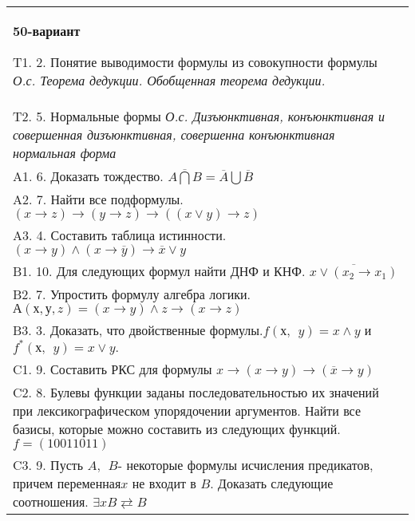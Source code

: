 \documentclass{article}
\begin{document}
\begin{tabular}{m{17cm}}
\textbf{50-вариант}
\newline

T1. 2. Понятие выводимости формулы из совокупности формулы \emph{О.с. Теорема дедукции. Обобщенная теорема дедукции.} \\
T2. 5. Нормальные формы \emph{О.с. Дизъюнктивная, конъюнктивная и совершенная дизъюнктивная, совершенна конъюнктивная нормальная форма} \\
A1. 6. Доказать тождество. \(\overline{A\bigcap B} = \overline{A}\bigcup\overline{B}\) \\
A2. 7. Найти все подформулы. \((x \rightarrow z) \rightarrow (y \rightarrow z) \rightarrow ((x \vee y) \rightarrow z)\) \\
A3. 4. Составить таблица истинности. \((x \rightarrow y) \land (x \rightarrow \overline{y}) \rightarrow \overline{x} \vee y\) \\
B1. 10. Для следующих формул найти ДНФ и КНФ. \(\overline{x \vee (x_{2} \rightarrow x_{1})}\) \\
B2. 7. Упростить формулу алгебра логики. \(А(х,у,z) = (x \rightarrow y) \land z \rightarrow (x \rightarrow z)\) \\
B3. 3. Доказать, что двойственные формулы.\(f(х,\ \ y) = x \land y\) и \(f^{*}(х,\ \ y) = x \vee y.\) \\
C1. 9. Составить РКС для формулы \(x \rightarrow (x \rightarrow y) \rightarrow (\overline{x} \rightarrow y)\ \) \\
C2. 8. Булевы функции заданы последовательностью их значений при лексикографическом упорядочении аргументов. Найти все базисы, которые можно составить из следующих функций. \(f = (10011011)\) \\
C3. 9. Пусть \(A,\ \ B\)- некоторые формулы исчисления предикатов, причем переменная\(x\) не входит в \(B\). Доказать следующие соотношения. \(\exists xB \rightleftarrows B\)
 \\

\end{tabular}
\vspace{1cm}
\end{document}
